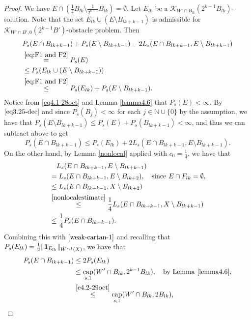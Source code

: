 \documentclass[11pt,leqno]{amsart}
\numberwithin{equation}{section}
\theoremstyle{definition}
\DeclareMathOperator{\capp}{cap}
\newcommand{\caps}{\capp_{s,1}}
\begin{document}
\begin{proof}
		We have $E\cap (\frac{1}{4}B_{lk}\setminus \frac{1}{2^{k-1}}B_{lk})=\emptyset$. 
		Let $E_{lk}$ be a $\mathcal{K}_{W'\cap B_{lk}}(2^{k-1}B_{lk}) $-solution.
		Note that the set $E_{lk}\cup (E\setminus B_{lk+k-1})$ is admissible for $\mathcal{K}_{W'\cap B',0}(2^{k-1}B')$-obstacle problem. Then
		\begin{align*}
			&P_s(E\cap B_{lk+k-1})+P_s(E\setminus B_{lk+k-1})-2L_s(E\cap B_{lk+k-1},E\setminus B_{lk+k-1})\\
			&\overset{\eqref{eq:F1 and F2}}{=} P_s(E)\\
			&\le P_s(E_{lk}\cup (E\setminus B_{lk+k-1}))\\
			&\overset{\eqref{eq:F1 and F2}}{\le } P_s(E_{lk})+P_s(E\setminus B_{lk+k-1}).
		\end{align*} 
		Notice from \eqref{eq4.1-28oct} and Lemma \ref{lemma4.6}
		that $P_s(E)<\infty$.
		By $\eqref{eq3.25-dec}$ and since $P_s(B_j)<\infty$ for each $j\in\mathbb N\cup \{ 0\}$ by the assumption, we have that $P_s(E\setminus B_{lk+k-1})\le P_s(E)+P_s(B_{lk+k-1})<\infty$, and thus we can subtract above to get
		\begin{equation}\label{weak-cartan-1}
			P_s(E\cap B_{lk+k-1})\le P_s(E_{lk})+2L_s(E\cap B_{lk+k-1}, E\setminus B_{lk+k-1}).
		\end{equation}
		On the other hand, by Lemma \ref{nonlocal} applied with $c_0=\frac{1}{4}$, we have that
		\begin{align*}
			&\quad L_s(E\cap B_{lk+k-1}, E\setminus B_{lk+k-1})\\
			&=L_s(E\cap B_{lk+k-1}, E\setminus B_{lk+2}),\quad \text{since }E\cap F_{lk}=\emptyset,\\
			&\le L_s(E\cap B_{lk+k-1}, X\setminus B_{lk+2})\\
			& \overset{\eqref{nonlocalestimate}}{\le }
			\frac{1}{4} L_s(E\cap B_{lk+k-1}, X\setminus B_{lk+k-1})\\
			&\le \frac{1}{4}P_s(E\cap B_{lk+k-1}).
		\end{align*}
		Combining this with $\eqref{weak-cartan-1}$ and recalling that $P_s(E_{lk})=\frac{1}{2}\|{\bf1}_{E_{lk}} \|_{\dot W^{s,1}(X)}$, we have that 
		\begin{align}
			P_s(E\cap B_{lk+k-1})
			&\le 2P_s(E_{lk})\notag\\
			&\le \caps(W'\cap B_{lk}, 2^{k-1}B_{lk}),\quad \text{by Lemma \ref{lemma4.6}},\notag\\
			&\overset{\eqref{e4.2-29oct}}{\le}\caps(W'\cap B_{lk}, 2B_{lk})
			\label{eq3.24-24Jan},
		\end{align}

\end{proof}
\end{document}
